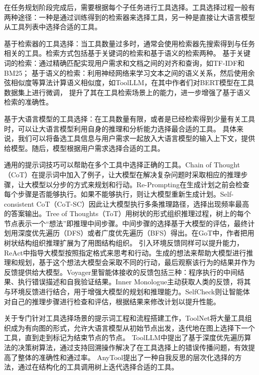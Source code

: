 在任务规划阶段完成后，需要根据每个子任务进行工具选择。工具选择过程一般有两种途径：一种是通过训练得到的检索器来选择工具，另一种是直接让大语言模型从工具列表中选择合适的工具。

基于检索器的工具选择：当工具数量过多时，通常会使用检索器先搜索得到与任务相关的工具。检索方式包括基于关键词的检索和基于语义的检索两种。
基于关键词的检索：通过精确匹配实现用户需求和文档之间的对齐和查询，如TF-IDF\cite{Jones1972}和BM25\cite{Robertson2009}；
基于语义的检索：利用神经网络来学习文本之间的语义关系，然后使用余弦相似度等算法计算语义相似度，如ToolLLM\cite{Qin2023}，在其中作者们对BERT模型在工具数据集上进行微调，
提升了其在工具检索场景上的能力，进一步增强了基于语义检索的准确性。

基于大语言模型的工具选择：在工具数量有限，或者是已经检索得到少量有关工具时，可以让大语言模型利用自身的推理和分析能力选择最合适的工具。
具体来说，我们可以将备选工具信息与用户需求一起放入大语言模型的输入上下文，提供给模型。随后，模型根据用户需求选择合适的工具。

通用的提示词技巧可以帮助在多个工具中选择正确的工具。Chain of Thought（CoT）\cite{Wang2023a}在提示词中加入了例子，让大模型在解决复杂问题时采取相应的推理步骤，让大模型以分步的方式来规划和行动。Re-Prompting\cite{Raman2022}在生成计划之前会检查每个步骤是否能够执行。如果不能够执行，则让大模型重新生成计划。Self-consistent CoT（CoT-SC）\cite{wang2022self}因此让大模型执行多条推理路径，选择出现频率最高的答案输出。Tree of Thoughts（ToT）\cite{Yao2023a}用树状的形式组织推理过程，树上的每个节点表示一个“想法”即推理中间步骤。中间步骤的选择基于大模型的评估，最终计划用深度优先遍历（DFS）或者广度优先遍历（BFS）得出。在GoT\cite{Besta2023}中，作者把用树状结构组织推理扩展为了用图结构组织。
引入环境反馈同样可以提升能力，ReAct\cite{Yao2023b}中指导大模型按照指定格式来思考和行动。生成的想法来帮助大模型进行推理和规划，基于这个想法大模型会采取不同的行动，最后观察该行为的结果并作为反馈提供给大模型。Voyager\cite{Wang2023b}里智能体接收的反馈包括三种：程序执行的中间结果、执行错误描述和自我验证结果。Inner Monologue\cite{Huang2022}主动获取人类的反馈，将其与环境反馈进行结合，用于增强大模型的规划和推理能力。SelfCheck\cite{Miao2023}则让智能体对自己的推理步骤进行检查和评估，根据结果来修改计划以提升性能。

关于专门针对工具选择场景的提示词工程和流程搭建工作，ToolNet\cite{Liu2024}将大量工具组织成为有向图的形式，允许大语言模型从初始节点出发，迭代地在图上选择下一个工具，直到走到标记为结束节点的节点。
ToolLLM\cite{Qin2023}中提出了基于深度优先遍历算法的决策树算法，通过支持回溯操作解决了在工具选择上的错误传播问题，有效提高了整体的准确性和通过率。
AnyTool\cite{Du2024}提出了一种自我反思的层次化选择的方法，通过在结构化的工具调用树上迭代选择合适的工具。

